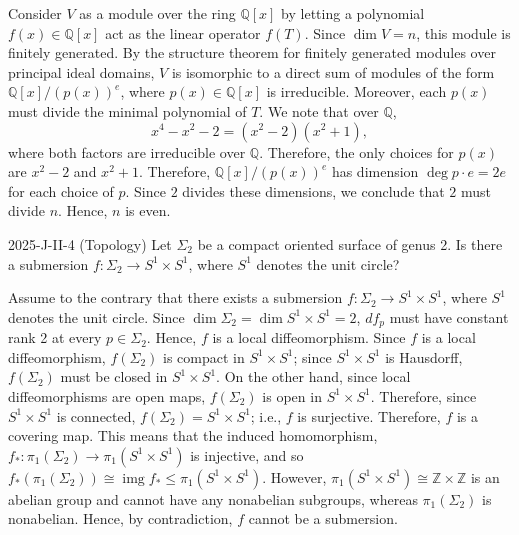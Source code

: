 \documentclass{article}
\begin{document}
\begin{solutions}
	Consider $V$ as a module over the ring $\mathbb{Q}[x]$ by letting a polynomial $f(x) \in \mathbb{Q}[x]$ act as the linear operator $f(T)$. Since $\dim{V} = n$, this module is finitely generated. By the structure theorem for finitely generated modules over principal ideal domains, $V$ is isomorphic to a direct sum of modules of the form $\mathbb{Q}[x]/(p(x))^{e}$, where $p(x) \in \mathbb{Q}[x]$ is irreducible. Moreover, each $p(x)$ must divide the minimal polynomial of $T$. We note that over $\mathbb{Q}$, 
		\begin{equation}
			x^{4} - x^{2} - 2 = (x^{2} - 2)(x^{2} + 1),
		\end{equation}
	where both factors are irreducible over $\mathbb{Q}$. Therefore, the only choices for $p(x)$ are $x^{2} - 2$ and $x^{2} + 1$. Therefore, $\mathbb{Q}[x]/(p(x))^{e}$ has dimension $\deg{p} \cdot e = 2e$ for each choice of $p$. Since $2$ divides these dimensions, we conclude that $2$ must divide $n$. Hence, $n$ is even. 
\end{solutions}
\begin{prb}{2025-J-II-4 (Topology)}
	Let $\Sigma_{2}$ be a compact oriented surface of genus 2. Is there a submersion $f: \Sigma_{2} \to S^{1} \times S^{1}$, where $S^{1}$ denotes the unit circle? 
\end{prb}
\begin{solutions}
	Assume to the contrary that there exists a submersion $f: \Sigma_{2} \to S^{1} \times S^{1}$, where $S^{1}$ denotes the unit circle. Since $\dim{\Sigma_{2}} = \dim{S^{1} \times S^{1}} = 2$, $df_{p}$ must have constant rank 2 at every $p \in \Sigma_{2}$. Hence, $f$ is a local diffeomorphism. Since $f$ is a local diffeomorphism, $f(\Sigma_{2})$ is compact in $S^{1} \times S^{1}$; since $S^{1} \times S^{1}$ is Hausdorff, $f(\Sigma_{2})$ must be closed in $S^{1} \times S^{1}$. On the other hand, since local diffeomorphisms are open maps, $f(\Sigma_{2})$ is open in $S^{1} \times S^{1}$. Therefore, since $S^{1} \times S^{1}$ is connected, $f(\Sigma_{2}) = S^{1} \times S^{1}$; i.e., $f$ is surjective. Therefore, $f$ is a covering map. This means that the induced homomorphism, $f_{\ast}: \pi_{1}(\Sigma_{2}) \to \pi_{1}(S^{1}\times S^{1})$ is injective, and so $f_{\ast}(\pi_{1}(\Sigma_{2})) \cong \operatorname{img}{f_{\ast}} \leq \pi_{1}(S^{1} \times S^{1})$. However, $\pi_{1}(S^{1} \times S^{1}) \cong \mathbb{Z} \times\mathbb{Z}$ is an abelian group and cannot have any nonabelian subgroups, whereas $\pi_{1}(\Sigma_{2})$ is nonabelian. Hence, by contradiction, $f$ cannot be a submersion. 
\end{solutions}
\end{document}
